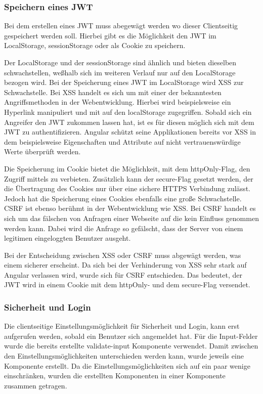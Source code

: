 \subsubsection{Speichern eines \gls{JWT}}
Bei dem erstellen eines \gls{JWT} muss abegewägt werden wo dieser Clientseitig gespeichert werden soll. Hierbei gibt es die Möglichkeit den \gls{JWT} im LocalStorage, sessionStorage oder als Cookie zu speichern.

Der LocalStorage und der sessionStorage sind ähnlich und bieten dieselben schwachstellen, weßhalb sich im weiteren Verlauf nur auf den LocalStorage bezogen wird. Bei der Speicherung eines \gls{JWT} im LocalStorage wird \gls{XSS} zur Schwachstelle. Bei \gls{XSS} handelt es sich um mit einer der bekanntesten Angriffsmethoden in der Webentwicklung. Hierbei wird beispielsweise ein Hyperlink manipuliert und mit \JS auf den localStorage zugegriffen. Sobald sich ein Angreifer den \gls{JWT} zukommen lassen hat, ist es für diesen möglich sich mit dem \gls{JWT} zu authentifizieren. Angular schützt seine Applikationen bereits vor \gls{XSS} in dem beispielsweise Eigenschaften und Attribute auf nicht vertrauenswürdige Werte überprüft werden.

Die Speicherung im Cookie bietet die Möglichkeit, mit dem httpOnly-Flag, den Zugriff mittels \JS zu verbieten. Zusätzlich kann der secure-Flag gesetzt werden, der die Übertragung des Cookies nur über eine sichere \gls{HTTPS} Verbindung zulässt. Jedoch hat die Speicherung eines Cookies ebenfalls eine große Schwachstelle. \gls{CSRF} ist ebenso berühmt in der Webentwicklung wie \gls{XSS}. Bei \gls{CSRF} handelt es sich um das fälschen von Anfragen einer Webseite auf die kein Einfluss genommen werden kann. Dabei wird die Anfrage so gefälscht, dass der Server von einem legitimen eingeloggten Benutzer ausgeht.

Bei der Entscheidung zwischen \gls{XSS} oder \gls{CSRF} muss abgewägt werden, was einem sicherer erscheint. Da sich bei der Verhinderung von \gls{XSS} sehr stark auf Angular verlassen wird, wurde sich für \gls{CSRF} entschieden. Das bedeutet, der \gls{JWT} wird in einem Cookie mit dem httpOnly- und dem secure-Flag versendet.

\subsubsection{Sicherheit und Login}
\label{sec:client-security-login}
Die clientseitige Einstellungsmöglichkeit für Sicherheit und Login, kann erst aufgerufen werden, sobald ein Benutzer sich angemeldet hat. Für die Input-Felder wurde die bereits erstellte validate-input Komponente verwendet. Damit zwischen den Einstellungsmöglichkeiten unterschieden werden kann, wurde jeweils eine Komponente erstellt. Da die Einstellungsmöglichkeiten sich auf ein paar wenige einschränken, wurden die erstellten Komponenten in einer Komponente zusammen getragen.

